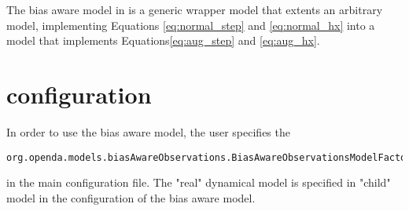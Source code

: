 The bias aware model in \oda is a generic wrapper model that extents an arbitrary \oda model, implementing Equations \ref{eq:normal_step} and \ref{eq:normal_hx} into a model that implements Equations\ref{eq:aug_step} and \ref{eq:aug_hx}.


\section{configuration}
In order to use the bias aware model, the user specifies the
\begin{verbatim}
org.openda.models.biasAwareObservations.BiasAwareObservationsModelFactory
\end{verbatim}
in the main \oda configuration file. The "real" dynamical model is specified in "child" model in the configuration of the bias aware model.


